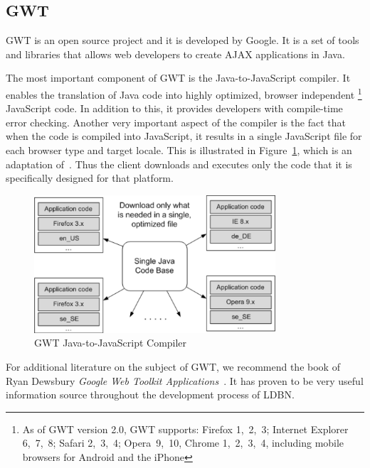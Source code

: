\subsection{GWT}
\label{sec:gwt}

GWT is an open source project
and it is developed by Google. It is a set of tools and libraries that allows web developers to
create AJAX applications in Java. 

The most important component of GWT is the Java-to-JavaScript compiler. It enables the
translation of Java code into highly optimized, browser independent
\footnote{As of GWT version 2.0, GWT supports: 
Firefox 1,~2,~3; Internet Explorer 6,~7,~8; Safari 2,~3,~4; Opera~9,~10, Chrome 1,~2,~3,~4, including mobile browsers for Android and the iPhone} 
JavaScript code.
In addition to this, it provides developers with compile-time error checking. Another
very important aspect of the compiler is the fact that when the code is compiled into
JavaScript, it results in a single JavaScript file for each browser type and target locale.
This is illustrated in Figure~\ref{fig:gwt01}, which is an adaptation of~\cite[Figure 7]{wgio2}. 
Thus the client downloads and executes only the code that it is specifically designed for that platform.  

\begin{figure}[h]
	\begin{center}
		\includegraphics[width=0.8\textwidth]{./img/gwt01a.png}
		\caption{GWT Java-to-JavaScript Compiler}
		\label{fig:gwt01}
	\end{center}
\end{figure}

For additional literature on the subject of GWT, we recommend the book of 
Ryan Dewsbury \textit{Google Web Toolkit Applications}~\cite{bgwt2}. It has
proven to be very useful information source throughout the development process 
of LDBN. 


